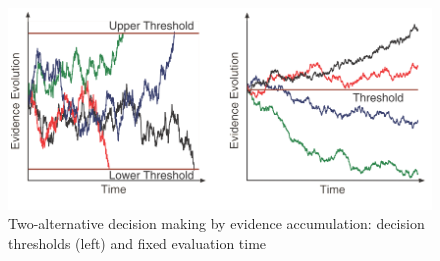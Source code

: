 \documentclass[a4paper,twoside, openright,12pt]{report}
\begin{document}
\begin{figure}
\centering
\includegraphics[width=1\linewidth]{EvidenceAcc.png}
\caption[Decision making by evidence accumulation]{Two-alternative decision making by evidence accumulation: decision thresholds (left) and fixed evaluation time \cite{Peters2015}}
\label{FIG:EvidenceAcc}
\end{figure}
\end{document}
